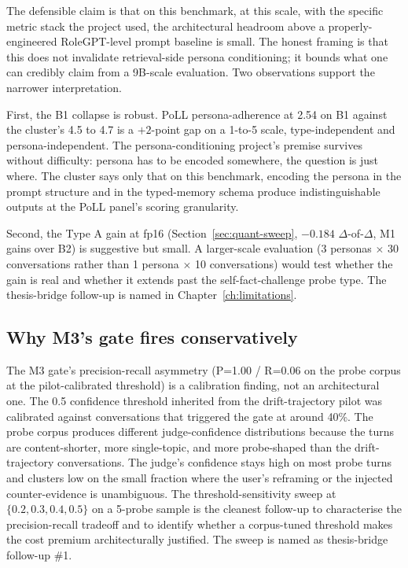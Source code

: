 The defensible claim is that on this benchmark, at this scale, with the specific metric stack the project used, the architectural headroom above a properly-engineered RoleGPT-level prompt baseline is small. The honest framing is that this does not invalidate retrieval-side persona conditioning; it bounds what one can credibly claim from a 9B-scale evaluation. Two observations support the narrower interpretation.

First, the B1 collapse is robust. PoLL persona-adherence at 2.54 on B1 against the cluster's 4.5 to 4.7 is a $+2$-point gap on a 1-to-5 scale, type-independent and persona-independent. The persona-conditioning project's premise survives without difficulty: persona has to be encoded somewhere, the question is just where. The cluster says only that on this benchmark, encoding the persona in the prompt structure and in the typed-memory schema produce indistinguishable outputs at the PoLL panel's scoring granularity.

Second, the Type A gain at fp16 (Section~\ref{sec:quant-sweep}, $-0.184$ $\Delta$-of-$\Delta$, M1 gains over B2) is suggestive but small. A larger-scale evaluation (3 personas $\times$ 30 conversations rather than 1 persona $\times$ 10 conversations) would test whether the gain is real and whether it extends past the self-fact-challenge probe type. The thesis-bridge follow-up is named in Chapter~\ref{ch:limitations}.

\subsection{Why M3's gate fires conservatively}

The M3 gate's precision-recall asymmetry (P=1.00 / R=0.06 on the probe corpus at the pilot-calibrated threshold) is a calibration finding, not an architectural one. The 0.5 confidence threshold inherited from the drift-trajectory pilot was calibrated against conversations that triggered the gate at around 40\%. The probe corpus produces different judge-confidence distributions because the turns are content-shorter, more single-topic, and more probe-shaped than the drift-trajectory conversations. The judge's confidence stays high on most probe turns and clusters low on the small fraction where the user's reframing or the injected counter-evidence is unambiguous. The threshold-sensitivity sweep at $\{0.2, 0.3, 0.4, 0.5\}$ on a 5-probe sample is the cleanest follow-up to characterise the precision-recall tradeoff and to identify whether a corpus-tuned threshold makes the cost premium architecturally justified. The sweep is named as thesis-bridge follow-up \#1.

